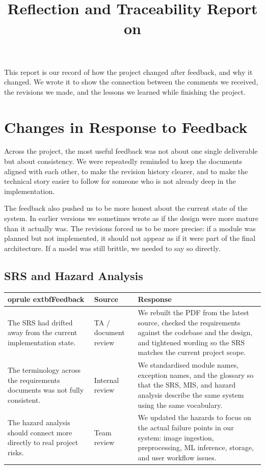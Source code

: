\documentclass{article}
\title{Reflection and Traceability Report on \progname}
\author{\authname}
\date{}
\begin{document}
\maketitle
\newpage
This report is our record of how the project changed after feedback, and why it
changed. We wrote it to show the connection between the comments we received,
the revisions we made, and the lessons we learned while finishing the project.

\section{Changes in Response to Feedback}

Across the project, the most useful feedback was not about one single deliverable
but about consistency. We were repeatedly reminded to keep the documents aligned
with each other, to make the revision history clearer, and to make the technical
story easier to follow for someone who is not already deep in the implementation.

The feedback also pushed us to be more honest about the current state of the
system. In earlier versions we sometimes wrote as if the design were more mature
than it actually was. The revisions forced us to be more precise: if a module was
planned but not implemented, it should not appear as if it were part of the final
architecture. If a model was still brittle, we needed to say so directly.

\subsection{SRS and Hazard Analysis}

\begin{tabularx}{\textwidth}{p{3.4cm} p{3.0cm} X}
	oprule
	extbf{Feedback} & \textbf{Source} & \textbf{Response} \\
\midrule
The SRS had drifted away from the current implementation state. & TA / document review & We rebuilt the PDF from the latest source, checked the requirements against the codebase and the design, and tightened wording so the SRS matches the current project scope. \\
\addlinespace
The terminology across the requirements documents was not fully consistent. & Internal review & We standardised module names, exception names, and the glossary so that the SRS, MIS, and hazard analysis describe the same system using the same vocabulary. \\
\addlinespace
The hazard analysis should connect more directly to real project risks. & Team review & We updated the hazards to focus on the actual failure points in our system: image ingestion, preprocessing, ML inference, storage, and user workflow issues. \\
\bottomrule
\end{tabularx}
\end{document}

